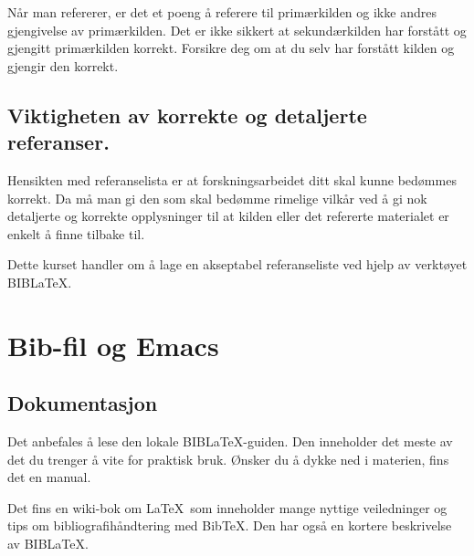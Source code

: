 \documentclass[11pt,norsk,a4paper]{article}
\newcommand{\bt}{BibTeX{}}
\newcommand{\blt}{B{\smaller[2]IB}\discretionary{-}{}{\kern
    -0.12em}\LaTeX{}}
\begin{document}
Når man refererer, er det et poeng å referere til primærkilden og ikke
andres gjengivelse av primærkilden. Det er ikke sikkert at
sekundærkilden har forstått og gjengitt primærkilden korrekt. Forsikre
deg om at du selv har forstått kilden og gjengir den korrekt.



\subsection*{Viktigheten av korrekte og detaljerte referanser.}
Hensikten med referanselista er at forskningsarbeidet
ditt skal kunne bedømmes korrekt. Da må man gi den som skal bedømme
rimelige vilkår ved å gi nok  detaljerte og korrekte opplysninger
til at kilden eller det refererte materialet er enkelt å finne
tilbake til.

Dette kurset handler om å lage en akseptabel referanseliste ved hjelp
av verktøyet \blt.

\section{Bib-fil og Emacs}
\subsection{Dokumentasjon}
Det anbefales å lese den lokale \blt-guiden\cite{langmyhr13}. Den
inneholder det meste av det du trenger å vite for praktisk
bruk. Ønsker du å dykke ned i materien, fins det en manual\cite{biblatex}.


Det fins en wiki-bok om \LaTeX\ som inneholder mange nyttige veiledninger
og tips om bibliografihåndtering med \bt. Den har også en kortere 
beskrivelse av \blt\cite{wikibook}.

%
\end{document}

